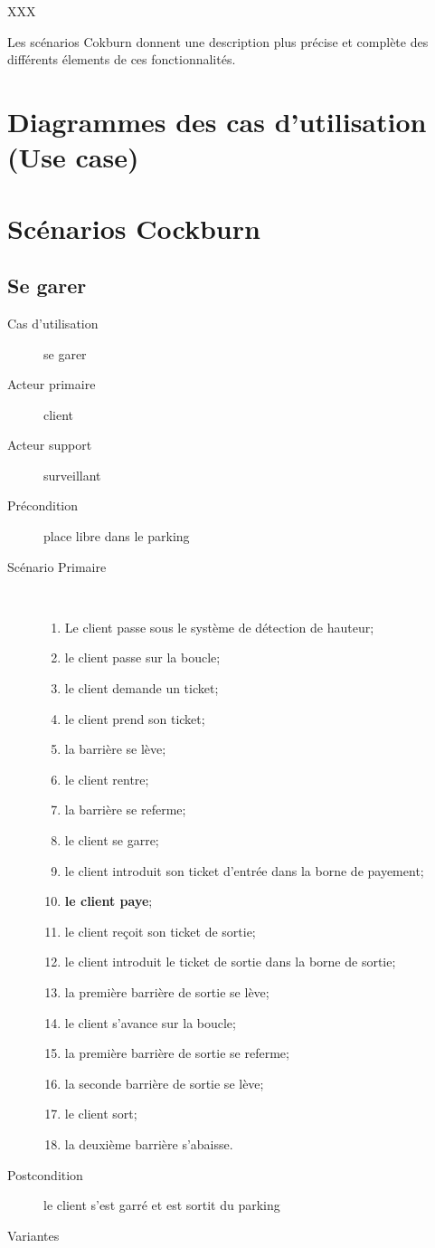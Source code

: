 \documentclass[a4paper]{article}
\begin{document}
XXX

Les sc\'enarios Cokburn donnent une description plus pr\'ecise et compl\`ete des diff\'erents
\'elements de ces fonctionnalit\'es.

\section{Diagrammes des cas d'utilisation (Use case)}
\section{Sc\'enarios Cockburn}
\subsection{Se garer}
\begin{description}
	\item[Cas d'utilisation] se garer
	\item[Acteur primaire] client
	\item[Acteur support] surveillant
	\item[Pr\'econdition] place libre dans le parking
	\item[Sc\'enario Primaire] \
	\begin{enumerate}
		\item Le client passe sous le syst\`eme de d\'etection de hauteur;
		\item le client passe sur la boucle;
		\item le client demande un ticket;
		\item le client prend son ticket;
		\item la barri\`ere se l\`eve;
		\item le client rentre;
		\item la barri\`ere se referme;
		\item le client se garre;
		\item le client introduit son ticket d'entr\'ee dans la borne de payement;
		\item \textbf{le client paye};
		\item le client re\c coit son ticket de sortie;
		\item le client introduit le ticket de sortie dans la borne de sortie;
		\item la premi\`ere barri\`ere de sortie se l\`eve;
		\item le client s'avance sur la boucle;
		\item la premi\`ere barri\`ere de sortie se referme;
		\item la seconde barri\`ere de sortie se l\`eve;
		\item le client sort;
		\item la deuxi\`eme barri\`ere s'abaisse.
	\end{enumerate}
	\item[Postcondition] le client s'est garr\'e et est sortit du parking
	\item[Variantes] \
\end{description}
\end{document}
